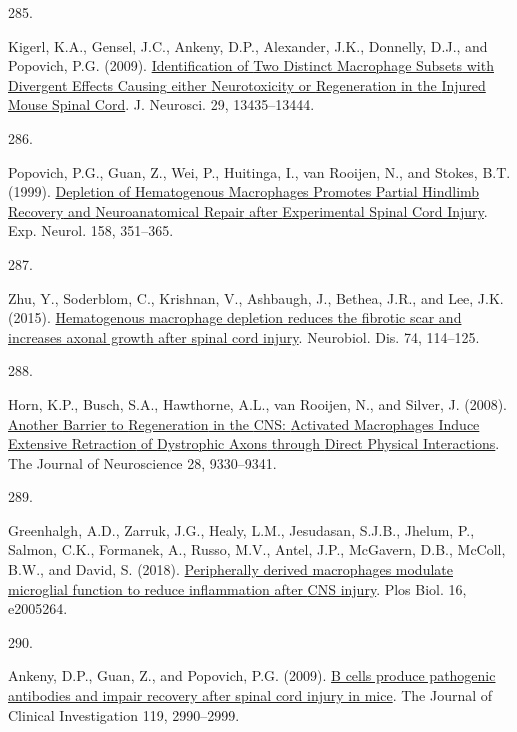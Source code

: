 \documentclass[
]{article}
\newlength{\cslhangindent}
\newlength{\csllabelwidth}
\newlength{\cslentryspacingunit} %
\newenvironment{CSLReferences}[2] %
 {%
  \setlength{\parindent}{0pt}
  \ifodd #1
  \let\oldpar\par
  \def\par{\hangindent=\cslhangindent\oldpar}
  \fi
  \setlength{\parskip}{#2\cslentryspacingunit}
 }%
 {}
\newcommand{\CSLLeftMargin}[1]{\parbox[t]{\csllabelwidth}{#1}}
\newcommand{\CSLRightInline}[1]{\parbox[t]{\linewidth - \csllabelwidth}{#1}\break}
\begin{document}
\begin{CSLReferences}{0}{0}
\leavevmode{}%
\CSLLeftMargin{285. }
\CSLRightInline{Kigerl, K.A., Gensel, J.C., Ankeny, D.P., Alexander, J.K., Donnelly, D.J., and Popovich, P.G. (2009). \href{https://doi.org/10.1523/JNEUROSCI.3257-09.2009}{Identification of {Two Distinct Macrophage Subsets} with {Divergent Effects Causing} either {Neurotoxicity} or {Regeneration} in the {Injured Mouse Spinal Cord}}. J. Neurosci. 29, 13435--13444.}

\leavevmode{}%
\CSLLeftMargin{286. }
\CSLRightInline{Popovich, P.G., Guan, Z., Wei, P., Huitinga, I., van Rooijen, N., and Stokes, B.T. (1999). \href{https://doi.org/10.1006/exnr.1999.7118}{Depletion of {Hematogenous Macrophages Promotes Partial Hindlimb Recovery} and {Neuroanatomical Repair} after {Experimental Spinal Cord Injury}}. Exp. Neurol. 158, 351--365.}

\leavevmode{}%
\CSLLeftMargin{287. }
\CSLRightInline{Zhu, Y., Soderblom, C., Krishnan, V., Ashbaugh, J., Bethea, J.R., and Lee, J.K. (2015). \href{https://doi.org/10.1016/j.nbd.2014.10.024}{Hematogenous macrophage depletion reduces the fibrotic scar and increases axonal growth after spinal cord injury}. Neurobiol. Dis. 74, 114--125.}

\leavevmode{}%
\CSLLeftMargin{288. }
\CSLRightInline{Horn, K.P., Busch, S.A., Hawthorne, A.L., van Rooijen, N., and Silver, J. (2008). \href{https://doi.org/10.1523/JNEUROSCI.2488-08.2008}{Another {Barrier} to {Regeneration} in the {CNS}: {Activated Macrophages Induce Extensive Retraction} of {Dystrophic Axons} through {Direct Physical Interactions}}. The Journal of Neuroscience 28, 9330--9341.}

\leavevmode{}%
\CSLLeftMargin{289. }
\CSLRightInline{Greenhalgh, A.D., Zarruk, J.G., Healy, L.M., Jesudasan, S.J.B., Jhelum, P., Salmon, C.K., Formanek, A., Russo, M.V., Antel, J.P., McGavern, D.B., McColl, B.W., and David, S. (2018). \href{https://doi.org/10.1371/journal.pbio.2005264}{Peripherally derived macrophages modulate microglial function to reduce inflammation after {CNS} injury}. Plos Biol. 16, e2005264.}

\leavevmode{}%
\CSLLeftMargin{290. }
\CSLRightInline{Ankeny, D.P., Guan, Z., and Popovich, P.G. (2009). \href{https://doi.org/10.1172/JCI39780}{B cells produce pathogenic antibodies and impair recovery after spinal cord injury in mice}. The Journal of Clinical Investigation 119, 2990--2999.}


\end{CSLReferences}
\end{document}
